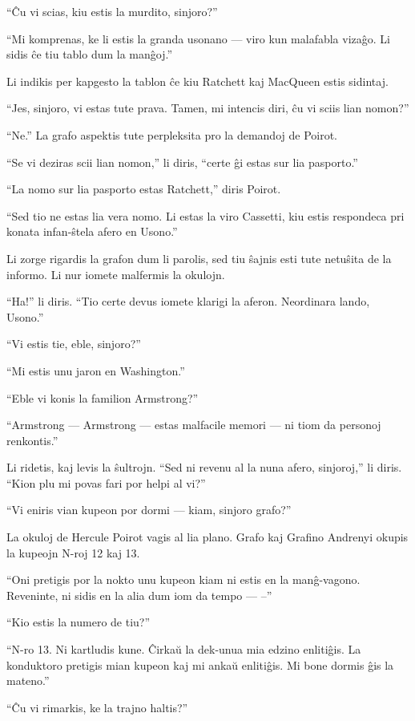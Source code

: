 ``Ĉu vi scias, kiu estis la murdito, sinjoro?''

``Mi komprenas, ke li estis la granda usonano --- viro kun malafabla vizaĝo. Li sidis ĉe tiu tablo dum la manĝoj.''

Li indikis per kapgesto la tablon ĉe kiu Ratchett kaj MacQueen estis sidintaj.

``Jes, sinjoro, vi estas tute prava. Tamen, mi intencis diri, ĉu vi sciis lian nomon?''

``Ne.'' La grafo aspektis tute perpleksita pro la demandoj de Poirot.

``Se vi deziras scii lian nomon,'' li diris, ``certe ĝi estas sur lia pasporto.''

``La nomo sur lia pasporto estas Ratchett,'' diris Poirot.

``Sed tio ne estas lia vera nomo. Li estas la viro Cassetti, kiu estis respondeca pri konata infan-ŝtela afero en Usono.''

Li zorge rigardis la grafon dum li parolis, sed tiu ŝajnis esti tute netuŝita de la informo. Li nur iomete malfermis la okulojn.

``Ha!'' li diris. ``Tio certe devus iomete klarigi la aferon. Neordinara lando, Usono.''

``Vi estis tie, eble, sinjoro?''

``Mi estis unu jaron en Washington.''

``Eble vi konis la familion Armstrong?''

``Armstrong --- Armstrong --- estas malfacile memori --- ni tiom da personoj renkontis.''

Li ridetis, kaj levis la ŝultrojn. ``Sed ni revenu al la nuna afero, sinjoroj,'' li diris. ``Kion plu mi povas fari por helpi al vi?''

``Vi eniris vian kupeon por dormi --- kiam, sinjoro grafo?''

La okuloj de Hercule Poirot vagis al lia plano. Grafo kaj Grafino Andrenyi okupis la kupeojn N-roj 12 kaj 13.

``Oni pretigis por la nokto unu kupeon kiam ni estis en la manĝ-vagono. Reveninte, ni sidis en la alia dum iom da tempo --- --''

``Kio estis la numero de tiu?''

``N-ro 13. Ni kartludis kune. Ĉirkaŭ la dek-unua mia edzino enlitiĝis. La konduktoro pretigis mian kupeon kaj mi ankaŭ enlitiĝis. Mi bone dormis ĝis la mateno.''

``Ĉu vi rimarkis, ke la trajno haltis?''

